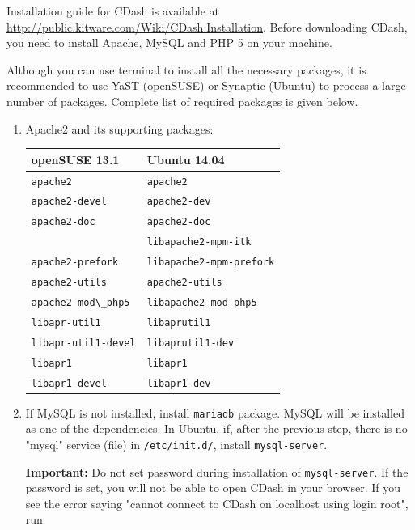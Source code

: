 Installation guide for CDash is available at \url{http://public.kitware.com/Wiki/CDash:Installation}. Before downloading CDash, you need to install Apache, MySQL and PHP 5 on your machine.

Although you can use terminal to install all the necessary packages, it is recommended to use YaST (openSUSE) or Synaptic (Ubuntu) to process a large number of packages. Complete list of required packages is given below.

\begin{enumerate}
 \item Apache2 and its supporting packages: 
 
\begin{center}
\begin{tabular}{|l|l|}
\hline
\textbf{openSUSE 13.1} & \textbf{Ubuntu 14.04}\\
\hline
\verb!apache2!            & \verb!apache2!     \\
\hline
\verb!apache2-devel!      & \verb!apache2-dev! \\
\hline
\verb!apache2-doc!        & \verb!apache2-doc! \\
\hline
                          & \verb!libapache2-mpm-itk! \\
\hline
\verb!apache2-prefork!	  & \verb!libapache2-mpm-prefork! \\
\hline
\verb!apache2-utils!      & \verb!apache2-utils! \\
\hline
\verb!apache2-mod\_php5!  & \verb!libapache2-mod-php5! \\
\hline
\verb!libapr-util1!       & \verb!libaprutil1! \\
\hline
\verb!libapr-util1-devel! & \verb!libaprutil1-dev! \\
\hline
\verb!libapr1!            & \verb!libapr1! \\
\hline
\verb!libapr1-devel!      & \verb!libapr1-dev! \\
\hline
\end{tabular}
\end{center}

\item If MySQL is not installed, install \verb!mariadb! package. MySQL will be installed as one of the dependencies. In Ubuntu, if, after the previous step, there is no "mysql" service (file) in \verb!/etc/init.d/!, install \verb!mysql-server!.

\bigskip

\textbf{Important:} Do not set password during installation of \verb!mysql-server!. If the password is set, you will not be able to open CDash in your browser. If you see the error saying "cannot connect to CDash on localhost using login root", run


\end{enumerate}
